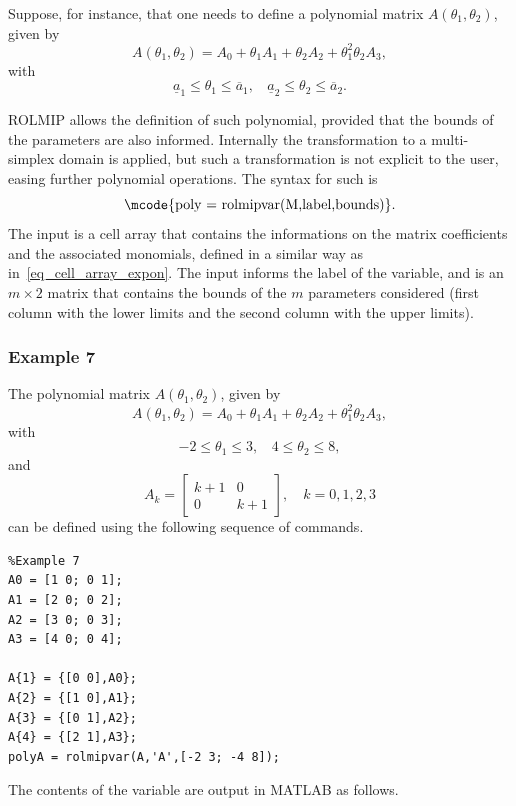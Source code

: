 \documentclass[english,11pt]{article}
\theoremstyle{break} \theorembodyfont{\small\rm}
\begin{document}
Suppose, for instance, that one needs to define a polynomial matrix $A(\theta_1,\theta_2)$, given by
\[
 A(\theta_1,\theta_2) = A_0 + \theta_1A_1 + \theta_2A_2 + \theta_1^2\theta_2A_3,
\]
with
\[
 \underline{a}_1 \leq \theta_1 \leq \overline{a}_1, ~~~  ~ \underline{a}_2 \leq \theta_2 \leq \overline{a}_2.
\]

ROLMIP allows the definition of such polynomial, provided that the bounds of the parameters are also
informed. Internally the transformation to a multi-simplex domain is applied, but such a transformation
is not explicit to the user, easing further polynomial operations. The syntax for such is
\[
\mbox{\mcode{poly = rolmipvar(M,label,bounds)}}.
\]
The input  is a cell array that contains the informations on the matrix coefficients and 
the associated monomials, defined in a similar way as in~\eqref{eq_cell_array_expon}. The input
 informs the label of the variable, and  is an $m \times 2$ matrix that contains 
the bounds of the $m$ parameters considered (first column with the lower limits and the second column with the upper limits).

\subsubsection*{Example 7}
The polynomial matrix $A(\theta_1,\theta_2)$, given by
\[
A(\theta_1,\theta_2) = A_0 + \theta_1A_1 + \theta_2A_2 + \theta_1^2\theta_2A_3,
\]
with
\[
 -2 \leq \theta_1 \leq 3, ~~~  ~ 4 \leq \theta_2 \leq 8,
\]
and 
\[
 A_k = \begin{bmatrix} k+1 & 0 \\ 0 & k+1 \end{bmatrix}, \quad k = 0, 1, 2, 3
\]
can be defined using the following sequence of commands.

\vspace{0.5cm}%
\begin{minipage}{9.0cm}
\begin{lstlisting}
%Example 7
A0 = [1 0; 0 1];
A1 = [2 0; 0 2];
A2 = [3 0; 0 3];
A3 = [4 0; 0 4];

A{1} = {[0 0],A0};
A{2} = {[1 0],A1};
A{3} = {[0 1],A2};
A{4} = {[2 1],A3};
polyA = rolmipvar(A,'A',[-2 3; -4 8]);
\end{lstlisting}
\end{minipage}
\vspace{0.2cm}

The contents of the variable  are output in MATLAB as follows.
\end{document}
